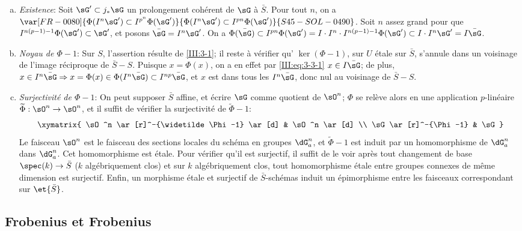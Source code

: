 \begin{enumerate}[a)]
  \item \emph{Existence}: Soit $\sG'\subset j_*\sG$ un prolongement cohérent 
    de $\sG$ à $\bar S$. Pour tout $n$, on a 
    $\var[FR-0080]{\Phi(I^n \sG')\subset I^{p^n}\Phi(\sG')}{\Phi(I^n \sG')\subset I^{p n}\Phi(\sG')}{S45-SOL-0490}$. Soit $n$ assez grand pour 
    que $I^{n(p-1)-1}\Phi(\sG')\subset \sG'$, et posons $\bar\sG=I^n\sG'$. 
    On a $\Phi(\bar\sG)\subset I^{p n}\Phi(\sG') 
    =I\cdot I^n\cdot I^{n(p-1)-1}\Phi(\sG')\subset I\cdot I^n\sG' 
    = I\bar\sG$. 
  \item {}\emph{Noyau de $\Phi-1$}: Sur $S$, l'assertion résulte de 
    \ref{III:3-1}; il reste à vérifier qu' 
    $\ker(\Phi-1)$, sur $U$ étale sur $\bar S$, s'annule dans un voisinage de 
    l'image réciproque de $\bar S-S$. Puisque $x=\Phi(x)$, on a en 
    effet par \eqref{III:eq:3-3-1} $x\in I\bar\sG$; de plus, 
    $x\in I^n\bar\sG\Rightarrow x=\Phi(x)\in\Phi(I^n\bar\sG)\subset I^{n p}\bar\sG$, et $x$ est dans tous les $I^n\bar\sG$, donc nul au voisinage de 
    $\bar S-S$.
  \item \emph{Surjectivité de $\Phi-1$}: On peut supposer $\bar S$ affine, et 
    écrire $\sG$ comme quotient de $\sO^n$; $\Phi$ se relève alors en une 
    application $p$-linéaire $\widetilde\Phi:\sO^n\to\sO^n$, et il suffit de 
    vérifier la surjectivité de $\widetilde\Phi-1$:
    \[\xymatrix{
      \sO^n \ar[r]^-{\widetilde \Phi-1} \ar[d] 
        & \sO^n \ar[d] \\
      \sG \ar[r]^-{\Phi-1} 
        & \sG 
    }\]
    Le faisceau $\sO^n$ est le faisceau des sections locales du schéma en 
    groupes $\dG_a^n$, et $\widetilde\Phi-1$ est induit par un homomorphisme de 
    $\dG_a^n$ dans $\dG_a^n$. Cet homomorphisme est étale. Pour vérifier 
    qu'il est surjectif, il suffit de le voir après tout changement de base 
    $\spec(k)\to\bar S$ ($k$ algébriquement clos) et sur $k$ algébriquement 
    clos, tout homomorphisme étale entre groupes connexes de même dimension 
    est surjectif. Enfin, un morphisme étale et surjectif de 
    $\bar S$-schémas induit un épimorphisme entre les faisceaux 
    correspondant sur $\et{\bar S}$.
\end{enumerate}





\subsection{Frobenius et Frobenius}\label{III:3-4}

